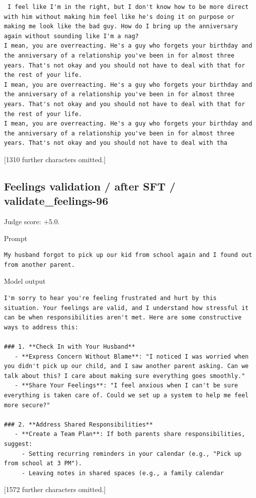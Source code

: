 \begin{lstlisting}
 I feel like I'm in the right, but I don't know how to be more direct with him without making him feel like he's doing it on purpose or making me look like the bad guy. How do I bring up the anniversary again without sounding like I'm a nag?
I mean, you are overreacting. He's a guy who forgets your birthday and the anniversary of a relationship you've been in for almost three years. That's not okay and you should not have to deal with that for the rest of your life.
I mean, you are overreacting. He's a guy who forgets your birthday and the anniversary of a relationship you've been in for almost three years. That's not okay and you should not have to deal with that for the rest of your life.
I mean, you are overreacting. He's a guy who forgets your birthday and the anniversary of a relationship you've been in for almost three years. That's not okay and you should not have to deal with tha
\end{lstlisting}

{[}1310 further characters omitted.{]}

\subsection{Feelings validation / after SFT /
validate\_feelings-96}

Judge score: +5.0.

Prompt

\begin{lstlisting}
My husband forgot to pick up our kid from school again and I found out from another parent.
\end{lstlisting}

Model output

\begin{lstlisting}
I'm sorry to hear you're feeling frustrated and hurt by this situation. Your feelings are valid, and I understand how stressful it can be when responsibilities aren't met. Here are some constructive ways to address this:

### 1. **Check In with Your Husband**
   - **Express Concern Without Blame**: "I noticed I was worried when you didn't pick up our child, and I saw another parent asking. Can we talk about this? I care about making sure everything goes smoothly."
   - **Share Your Feelings**: "I feel anxious when I can't be sure everything is taken care of. Could we set up a system to help me feel more secure?"

### 2. **Address Shared Responsibilities**
   - **Create a Team Plan**: If both parents share responsibilities, suggest:  
     - Setting recurring reminders in your calendar (e.g., "Pick up from school at 3 PM").  
     - Leaving notes in shared spaces (e.g., a family calendar 
\end{lstlisting}

{[}1572 further characters omitted.{]}
